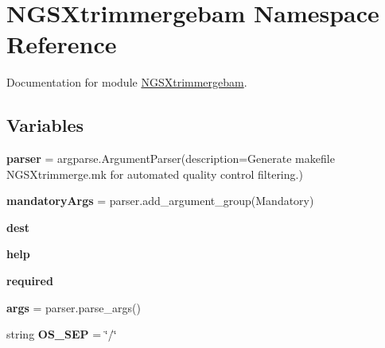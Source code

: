 \hypertarget{namespaceNGSXtrimmergebam}{}\section{N\+G\+S\+Xtrimmergebam Namespace Reference}
\label{namespaceNGSXtrimmergebam}


Documentation for module \hyperlink{namespaceNGSXtrimmergebam}{N\+G\+S\+Xtrimmergebam}.  


\subsection*{Variables}
\begin{DoxyCompactItemize}
\item 
{\bfseries parser} = argparse.\+Argument\+Parser(description=\textquotesingle{}Generate makefile N\+G\+S\+Xtrimmerge.\+mk for automated quality control filtering.\textquotesingle{})\hypertarget{namespaceNGSXtrimmergebam_a03ed7d0ae5aab1d4c099ac2e7f1ca0d1}{}\label{namespaceNGSXtrimmergebam_a03ed7d0ae5aab1d4c099ac2e7f1ca0d1}

\item 
{\bfseries mandatory\+Args} = parser.\+add\+\_\+argument\+\_\+group(\textquotesingle{}Mandatory\textquotesingle{})\hypertarget{namespaceNGSXtrimmergebam_aa0942ca8cc1f5727d94a3f8b2d6aed29}{}\label{namespaceNGSXtrimmergebam_aa0942ca8cc1f5727d94a3f8b2d6aed29}

\item 
{\bfseries dest}\hypertarget{namespaceNGSXtrimmergebam_a91652604a925fade79e83997c4bef843}{}\label{namespaceNGSXtrimmergebam_a91652604a925fade79e83997c4bef843}

\item 
{\bfseries help}\hypertarget{namespaceNGSXtrimmergebam_a28c8bb18013e171c92be900ad451271d}{}\label{namespaceNGSXtrimmergebam_a28c8bb18013e171c92be900ad451271d}

\item 
{\bfseries required}\hypertarget{namespaceNGSXtrimmergebam_a3cfd512d52a13fdc19a1d40778ebd61e}{}\label{namespaceNGSXtrimmergebam_a3cfd512d52a13fdc19a1d40778ebd61e}

\item 
{\bfseries args} = parser.\+parse\+\_\+args()\hypertarget{namespaceNGSXtrimmergebam_a6db502d84138b24dc3baa31aa6936d5e}{}\label{namespaceNGSXtrimmergebam_a6db502d84138b24dc3baa31aa6936d5e}

\item 
string {\bfseries O\+S\+\_\+\+S\+EP} = \char`\"{}/\char`\"{}\hypertarget{namespaceNGSXtrimmergebam_a03eb67adbf1f950c715798af1cb6024d}{}\label{namespaceNGSXtrimmergebam_a03eb67adbf1f950c715798af1cb6024d}


\end{DoxyCompactItemize}

